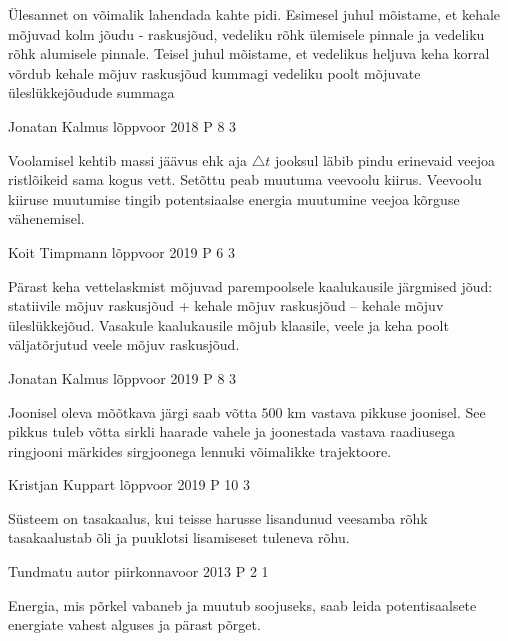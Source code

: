 \documentclass[11pt]{article}
\begin{document}
{{\ifHint
Ülesannet on võimalik lahendada kahte pidi. Esimesel juhul mõistame, et kehale mõjuvad kolm jõudu - raskusjõud, vedeliku rõhk ülemisele pinnale ja vedeliku rõhk alumisele pinnale. Teisel juhul mõistame, et vedelikus heljuva keha korral võrdub kehale mõjuv raskusjõud kummagi vedeliku poolt mõjuvate üleslükkejõudude summaga
\fi
}


{Jonatan Kalmus} %
{lõppvoor} %
{2018} %
{P 8} %
{3} %
{

\ifHint
Voolamisel kehtib massi jäävus ehk aja $\triangle t$ jooksul läbib pindu erinevaid veejoa ristlõikeid sama kogus vett. Setõttu peab muutuma veevoolu kiirus. Veevoolu kiiruse muutumise tingib potentsiaalse energia muutumine veejoa kõrguse vähenemisel.
\fi
}

{Koit Timpmann} %
{lõppvoor} %
{2019} %
{P 6} %
{3} %
{

\ifHint
Pärast keha vettelaskmist mõjuvad parempoolsele kaalukausile järgmised jõud: statiivile mõjuv raskusjõud + kehale mõjuv raskusjõud – kehale mõjuv üleslükkejõud. Vasakule kaalukausile mõjub klaasile, veele ja keha poolt väljatõrjutud veele mõjuv raskusjõud.
\fi
}

{Jonatan Kalmus} %
{lõppvoor} %
{2019} %
{P 8} %
{3} %
{

\ifHint
Joonisel oleva mõõtkava järgi saab võtta $500$ km vastava pikkuse joonisel. See pikkus tuleb võtta sirkli haarade vahele ja joonestada vastava raadiusega ringjooni märkides sirgjoonega lennuki võimalikke trajektoore.
\fi
}
 


{Kristjan Kuppart} %
{lõppvoor} %
{2019} %
{P 10} %
{3} %
{

\ifHint
Süsteem on tasakaalus, kui teisse harusse lisandunud veesamba rõhk tasakaalustab õli ja puuklotsi lisamiseset tuleneva rõhu.
\fi
}

{Tundmatu autor} %
{piirkonnavoor} %
{2013} %
{P 2} %
{1} %
{

\ifHint
Energia, mis põrkel vabaneb ja muutub soojuseks, saab leida  potentisaalsete energiate vahest alguses ja pärast põrget.
\fi
}

}
\end{document}
